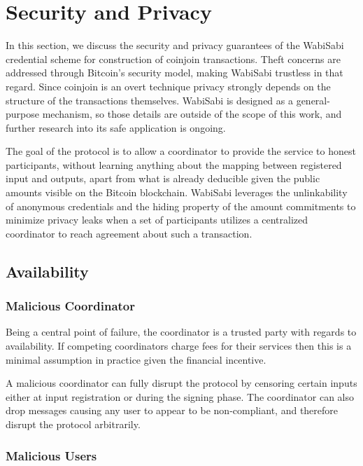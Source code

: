\documentclass[a4paper]{article}
\begin{document}
\section{Security and Privacy} \label{sec:securitayandprivacy}

In this section, we discuss the security and privacy guarantees of the WabiSabi credential scheme for construction of coinjoin transactions. Theft concerns are addressed through Bitcoin's security model, making WabiSabi trustless in that regard. Since coinjoin is an overt technique privacy strongly depends on the structure of the transactions themselves. WabiSabi is designed as a general-purpose mechanism, so those details are outside of the scope of this work, and further research into its safe application is ongoing.

The goal of the protocol is to allow a coordinator to provide the service to honest participants, without learning anything about the mapping between registered input and outputs, apart from what is already deducible given the public amounts visible on the Bitcoin blockchain. WabiSabi leverages the unlinkability of anonymous credentials and the hiding property of the amount commitments to minimize privacy leaks when a set of participants utilizes a centralized coordinator to reach agreement about such a transaction.

\subsection{Availability}

\subsubsection{Malicious Coordinator}

Being a central point of failure, the coordinator is a trusted party with regards to availability. If competing coordinators charge fees for their services then this is a minimal assumption in practice given the financial incentive.

A malicious coordinator can fully disrupt the protocol by censoring certain inputs either at input registration or during the signing phase. The coordinator can also drop messages causing any user to appear to be non-compliant, and therefore disrupt the protocol arbitrarily.

\subsubsection{Malicious Users}
\end{document}
